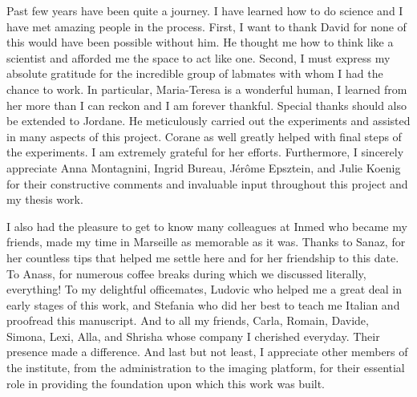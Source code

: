 Past few years have been quite a journey.
I have learned how to do science and I have met amazing people in the process.
First, I want to thank David for none of this would have been possible without him.
He thought me how to think like a scientist and afforded me the space to act like one.
Second, I must express my absolute gratitude for the incredible group of labmates with whom I had the chance to work.
In particular, Maria-Teresa is a wonderful human, I learned from her more than I can reckon and I am forever thankful.
Special thanks should also be extended to Jordane.
He meticulously carried out the experiments and assisted in many aspects of this project.
Corane as well greatly helped with final steps of the experiments.
I am extremely grateful for her efforts.
Furthermore, I sincerely appreciate Anna Montagnini, Ingrid Bureau, J\'{e}r\^{o}me Epsztein, and Julie Koenig for their constructive comments and invaluable input throughout this project and my thesis work.
\par
I also had the pleasure to get to know many colleagues at Inmed who became my friends, made my time in Marseille as memorable as it was.
Thanks to Sanaz, for her countless tips that helped me settle here and for her friendship to this date.
To Anass, for numerous coffee breaks during which we discussed literally, everything!
To my delightful officemates, Ludovic who helped me a great deal in early stages of this work, and Stefania who did her best to teach me Italian and proofread this manuscript.
And to all my friends, Carla, Romain, Davide, Simona, Lexi, Alla, and Shrisha whose company I cherished everyday.
Their presence made a difference.
And last but not least, I appreciate other members of the institute, from the administration to the imaging platform, for their essential role in providing the foundation upon which this work was built.